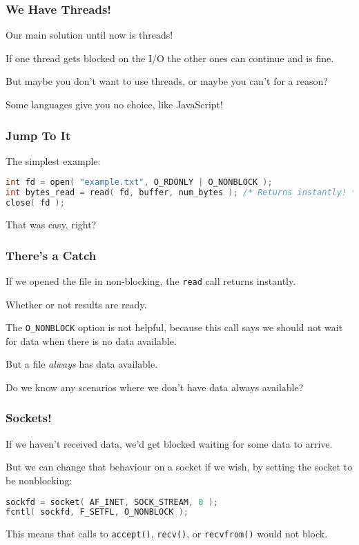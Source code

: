 \begin{frame}
	\frametitle{We Have Threads!}

	Our main solution until now is threads!

	If one thread gets blocked on the I/O the other ones can continue and is fine.

	But maybe you don't want to use threads, or maybe you can't for a reason?

	Some languages give you no choice, like JavaScript!

\end{frame}


\begin{frame}[fragile]
	\frametitle{Jump To It}

	The simplest example:

	\begin{lstlisting}[language=C]
int fd = open( "example.txt", O_RDONLY | O_NONBLOCK );
int bytes_read = read( fd, buffer, num_bytes ); /* Returns instantly! */
close( fd );
\end{lstlisting}

	That was easy, right?

\end{frame}


\begin{frame}
	\frametitle{There's a Catch}

	If we opened the file in non-blocking, the \texttt{read} call returns instantly.

	Whether or not results are ready.

	The \texttt{O\_NONBLOCK} option is not helpful, because this call says we should not wait for data when there is no data available.

	But a file \textit{always} has data available.

	Do we know any scenarios where we don't have data always available?

\end{frame}


\begin{frame}[fragile]
	\frametitle{Sockets!}

	If we haven't received data, we'd get blocked waiting for some data to arrive.

	But we can change that behaviour on a socket if we wish, by setting the socket to be nonblocking:

	\begin{lstlisting}[language=C]
sockfd = socket( AF_INET, SOCK_STREAM, 0 );
fcntl( sockfd, F_SETFL, O_NONBLOCK );
\end{lstlisting}

	This means that calls to \texttt{accept()}, \texttt{recv()}, or \texttt{recvfrom()} would not block.

\end{frame}

